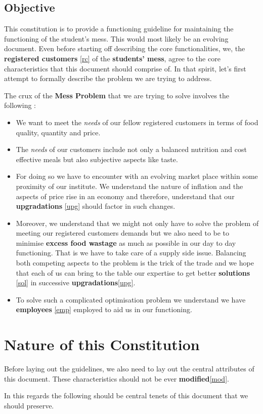 \documentclass[12pt]{report}
\begin{document}
\section{Objective}
This constitution is to provide a functioning guideline for maintaining the functioning of the student's mess. This would most likely be an evolving document. Even before starting off describing the core functionalities, we, the \textbf{registered customers} \ref{rc} of the \textbf{students' mess}, agree to the core characteristics that this document should comprise of. In that spirit, let's first attempt to formally describe the problem we are trying to address.
\par The crux of the \textbf{ Mess Problem} that we are trying to solve involves the following :
\begin{itemize}
\item We want to meet the \textit{needs} of our fellow registered customers in terms of food quality, quantity and price.
\item The \textit{needs} of our customers include not only a balanced nutrition and cost effective meals but also subjective aspects like taste.
\item For doing so we have to encounter with an evolving market place within some proximity of our institute. We understand the nature of inflation and the aspects of price rise in an economy and therefore, understand that our \textbf{upgradations} \ref{upg} should factor in such changes.
\item Moreover, we understand that we might not only have to solve the problem of meeting our registered customers demands but we also need to be to minimise \textbf{excess food wastage} as much as possible in our day to day functioning. That is we have to take care of a supply side issue. Balancing both competing aspects to the problem is the trick of the trade and we hope that each of us can bring to the table our expertise to get better \textbf{solutions} \ref{sol} in successive \textbf{upgradations}\ref{upg}.
\item To solve such a complicated optimisation problem we understand we have \textbf{employees} \ref{emp} employed to aid us in our functioning. 
\end{itemize}

\chapter{Nature of this Constitution}
Before laying out the guidelines, we also need to lay out the central attributes of this document. These characteristics should not be ever \textbf{modified}\ref{mod}.
\par In this regards the following should be central tenets of this document that we should preserve.
\end{document}

